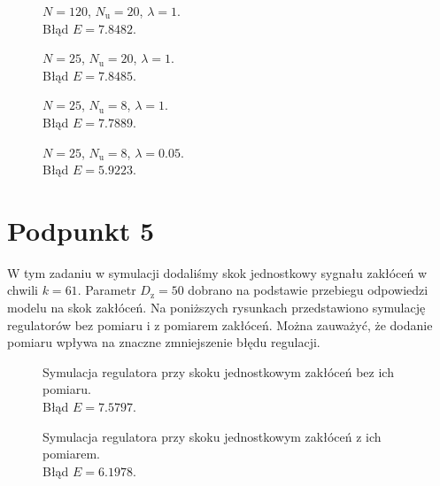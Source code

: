 \begin{figure}[ht]
\centering

\caption{$ N = \num{120} $, $ N_\mathrm{u} = \num{20} $, $ \lambda = \num{1} $.\\Błąd $ E = \num{7,8482} $.}
\label{Z4a}
\end{figure}
\begin{figure}[ht]
\centering

\caption{$ N = \num{25} $, $ N_\mathrm{u} = \num{20} $, $ \lambda = \num{1} $.\\Błąd $ E = \num{7,8485} $.}
\label{Z4b}
\end{figure}
\begin{figure}[ht]
\centering

\caption{$ N = \num{25} $, $ N_\mathrm{u} = \num{8} $, $ \lambda = \num{1} $.\\Błąd $ E = \num{7,7889} $.}
\label{Z4c}
\end{figure}
\begin{figure}[ht]
\centering

\caption{$ N = \num{25} $, $ N_\mathrm{u} = \num{8} $, $ \lambda = \num{0,05} $.\\Błąd $ E = \num{5,9223} $.}
\label{Z4d}
\end{figure}


\chapter{Podpunkt 5}
W tym zadaniu w symulacji dodaliśmy skok jednostkowy sygnału zakłóceń w chwili $ k = 61 $. Parametr $ D_\mathrm{z} = 50 $ dobrano na podstawie przebiegu odpowiedzi modelu na skok zakłóceń. Na poniższych rysunkach przedstawiono symulację regulatorów bez pomiaru i z pomiarem zakłóceń. Można zauważyć, że dodanie pomiaru wpływa na znaczne zmniejszenie błędu regulacji.


\begin{figure}[ht]
\centering

\caption{Symulacja regulatora przy skoku jednostkowym zakłóceń bez ich pomiaru.\\Błąd $ E = \num{7,5797} $.}
\label{Z5a}
\end{figure}
\begin{figure}[ht]
\centering

\caption{Symulacja regulatora przy skoku jednostkowym zakłóceń z ich pomiarem.\\Błąd $ E = \num{6,1978} $.}
\label{Z5b}
\end{figure}


